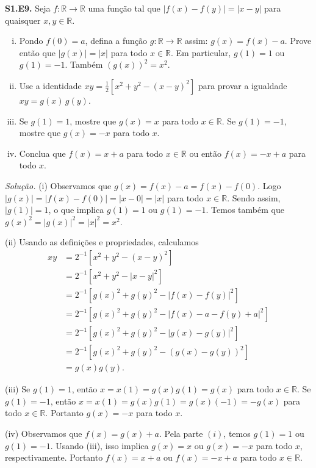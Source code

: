 \documentclass[a4paper,11pt]{article}
\newcommand{\R}{\mathbb{R}}
\begin{document}
\vspace{\baselineskip}

\textbf{S1.E9.}
Seja $f : \R \to \R$ uma função tal que $|f(x)-f(y)| = |x-y|$ para quaisquer $x,y \in \R$.
\begin{enumerate}[(i)]
  \item
    Pondo $f(0) = a$, defina a função $g : \R \to \R$ assim: $g(x) = f(x) - a$.
    Prove então que $|g(x)| = |x|$ para todo $x \in \R$.
    Em particular, $g(1) = 1$ ou $g(1) = -1$.
    Também $(g(x))^2 = x^2$.
  \item
    Use a identidade $xy = \frac{1}{2}[ x^2 + y^2 - (x-y)^2 ]$ para provar a igualdade $xy = g(x)\,g(y)$.
  \item
    Se $g(1) = 1$, mostre que $g(x) = x$ para todo $x \in \R$.
    Se $g(1) = -1$, mostre que $g(x) = -x$ para todo $x$.
  \item
    Conclua que $f(x) = x + a$ para todo $x \in \R$ ou então $f(x) = -x + a$ para todo $x$.
\end{enumerate}

\vspace{\baselineskip}

\emph{Solução.}
(i)
Observamos que $g(x) = f(x) - a = f(x) - f(0)$.
Logo $|g(x)| = |f(x)-f(0)| = |x-0| = |x|$ para todo $x \in \R$.
Sendo assim, $|g(1)| = 1$, o que implica $g(1) = 1$ ou $g(1) = -1$.
Temos também que $g(x)^2 = |g(x)|^2 = |x|^2 = x^2$.

(ii)
Usando as definições e propriedades, calculamos
\begin{align*}
  xy & = 2^{-1} [x^2 + y^2 - (x-y)^2 ] \\
  & = 2^{-1} [ x^2 + y^2 - |x-y|^2 ] \\
  & = 2^{-1} [ g(x)^2 + g(y)^2 - |f(x) - f(y)|^2 ] \\
  & = 2^{-1} [ g(x)^2 + g(y)^2 - |f(x) - a - f(y) + a|^2 ] \\
  & = 2^{-1} [ g(x)^2 + g(y)^2 - |g(x) - g(y)|^2 ] \\
  & = 2^{-1} [ g(x)^2 + g(y)^2 - (g(x) - g(y))^2 ] \\
  & = g(x)g(y).
\end{align*}

(iii)
Se $g(1)=1$, então $x = x(1) = g(x)g(1) = g(x)$ para todo $x \in \R$.
Se $g(1)=-1$, então $x = x(1) = g(x)g(1) = g(x)(-1) = -g(x)$ para todo $x \in \R$.
Portanto $g(x) = -x$ para todo $x$.

(iv)
Observamos que $f(x) = g(x) + a$.
Pela parte $(i)$, temos $g(1) = 1$ ou $g(1) = -1$.
Usando (iii), isso implica $g(x)=x$ ou $g(x) = -x$ para todo $x$, respectivamente.
Portanto $f(x) = x + a$ ou $f(x) = -x + a$ para todo $x \in \R$.
\end{document}
